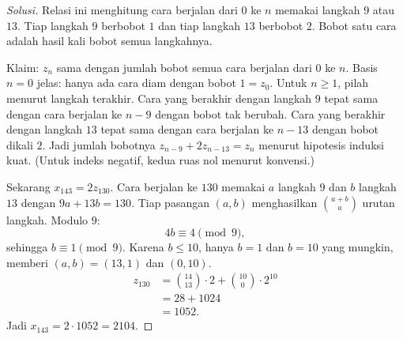 \documentclass[12pt]{scrartcl}
\begin{document}
\begin{enumerate}
\begin{proof}[Solusi]
	Relasi ini menghitung cara berjalan dari $0$ ke $n$
	memakai langkah $9$ atau $13$. Tiap langkah $9$ berbobot $1$ dan tiap
	langkah $13$ berbobot $2$. Bobot satu cara adalah hasil kali bobot
	semua langkahnya.

	Klaim: $z_n$ sama dengan jumlah bobot semua cara berjalan dari $0$ ke $n$.
	Basis $n = 0$ jelas: hanya ada cara diam dengan bobot $1 = z_0$.
	Untuk $n \ge 1$, pilah menurut langkah terakhir. Cara yang berakhir dengan
	langkah $9$ tepat sama dengan cara berjalan ke $n - 9$ dengan bobot tak berubah.
	Cara yang berakhir dengan langkah $13$ tepat sama dengan cara
	berjalan ke $n - 13$ dengan bobot dikali $2$. Jadi jumlah bobotnya
	$z_{n-9} + 2z_{n-13} = z_n$ menurut hipotesis induksi kuat. (Untuk indeks
	negatif, kedua ruas nol menurut konvensi.)

	Sekarang $x_{143} = 2z_{130}$. Cara berjalan ke $130$ memakai $a$ langkah
	$9$ dan $b$ langkah $13$ dengan $9a + 13b = 130$. Tiap pasangan $(a, b)$
	menghasilkan $\binom{a+b}{a}$ urutan langkah. Modulo $9$:
	\[ 4b \equiv 4 \pmod{9}, \]
	sehingga $b \equiv 1 \pmod{9}$. Karena $b \le 10$, hanya $b = 1$ dan
	$b = 10$ yang mungkin, memberi $(a, b) = (13, 1)$ dan $(0, 10)$.
	\begin{align*}
	z_{130} &= \binom{14}{13} \cdot 2 + \binom{10}{0} \cdot 2^{10} \\
	&= 28 + 1024 \\
	&= 1052.
	\end{align*}
	Jadi $x_{143} = 2 \cdot 1052 = 2104$.
	\end{proof}


\end{enumerate}
\end{document}
